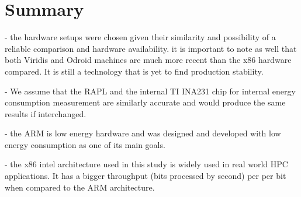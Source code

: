 \clearpage 

\section{Summary}
- the hardware setups were chosen given their similarity and possibility of
  a reliable comparison and hardware availability. it is important to note as
well that both Viridis and Odroid machines are much more recent than the x86
hardware compared. It is still a technology that is yet to find production
stability.

- We assume that the RAPL and the internal TI INA231 chip for internal energy
  consumption measurement are similarly accurate and would produce the same
results if interchanged. 

- the ARM is low energy hardware and was designed and developed with low energy
  consumption as one of its  main goals.

- the x86 intel architecture used in this study is widely used in real world
  HPC applications. It has a bigger throughput (bits processed by second) per
per bit when compared to the ARM architecture.


